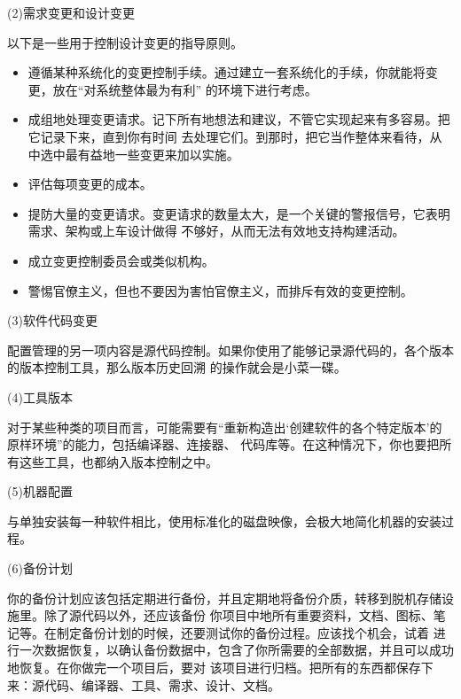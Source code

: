 \documentclass{article}
\begin{document}
\par
(2)需求变更和设计变更
\par
以下是一些用于控制设计变更的指导原则。
\begin{itemize}
    \item 遵循某种系统化的变更控制手续。通过建立一套系统化的手续，你就能将变更，放在“对系统整体最为有利”
    的环境下进行考虑。
    \item 成组地处理变更请求。记下所有地想法和建议，不管它实现起来有多容易。把它记录下来，直到你有时间
    去处理它们。到那时，把它当作整体来看待，从中选中最有益地一些变更来加以实施。
    \item 评估每项变更的成本。
    \item 提防大量的变更请求。变更请求的数量太大，是一个关键的警报信号，它表明需求、架构或上车设计做得
    不够好，从而无法有效地支持构建活动。
    \item 成立变更控制委员会或类似机构。
    \item 警惕官僚主义，但也不要因为害怕官僚主义，而排斥有效的变更控制。
\end{itemize}

\par
(3)软件代码变更
\par
配置管理的另一项内容是源代码控制。如果你使用了能够记录源代码的，各个版本的版本控制工具，那么版本历史回溯
的操作就会是小菜一碟。

\par
(4)工具版本
\par
对于某些种类的项目而言，可能需要有“重新构造出‘创建软件的各个特定版本’的原样环境”的能力，包括编译器、连接器、
代码库等。在这种情况下，你也要把所有这些工具，也都纳入版本控制之中。

\par
(5)机器配置
\par
与单独安装每一种软件相比，使用标准化的磁盘映像，会极大地简化机器的安装过程。

\par
(6)备份计划
\par
你的备份计划应该包括定期进行备份，并且定期地将备份介质，转移到脱机存储设施里。除了源代码以外，还应该备份
你项目中地所有重要资料，文档、图标、笔记等。在制定备份计划的时候，还要测试你的备份过程。应该找个机会，试着
进行一次数据恢复，以确认备份数据中，包含了你所需要的全部数据，并且可以成功地恢复。在你做完一个项目后，要对
该项目进行归档。把所有的东西都保存下来：源代码、编译器、工具、需求、设计、文档。
\end{document}
